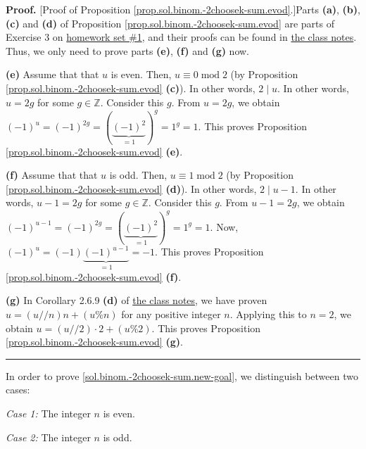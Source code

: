 \documentclass[paper=a4, fontsize=12pt]{scrartcl}%
\theoremstyle{plainsl}
\theoremstyle{definition}
\theoremstyle{remark}
\newenvironment{proof}[1][Proof]{\noindent\textbf{#1.} }{\ \rule{0.5em}{0.5em}}
\begin{document}
\begin{proof}
[Proof of Proposition \ref{prop.sol.binom.-2choosek-sum.evod}.]Parts
\textbf{(a)}, \textbf{(b)}, \textbf{(c)} and \textbf{(d)} of Proposition
\ref{prop.sol.binom.-2choosek-sum.evod} are parts of Exercise 3 on
\href{http://www-users.math.umn.edu/~dgrinber/19s/hw1s.pdf}{homework set \#1},
and their proofs can be found in
\href{http://www-users.math.umn.edu/~dgrinber/19s/notes.pdf}{the class notes}.
Thus, we only need to prove parts \textbf{(e)}, \textbf{(f)} and \textbf{(g)} now.

\textbf{(e)} Assume that that $u$ is even. Then, $u\equiv0\operatorname{mod}2$
(by Proposition \ref{prop.sol.binom.-2choosek-sum.evod} \textbf{(c)}). In
other words, $2\mid u$. In other words, $u=2g$ for some $g\in\mathbb{Z}$.
Consider this $g$. From $u=2g$, we obtain $\left(  -1\right)  ^{u}=\left(
-1\right)  ^{2g}=\left(  \underbrace{\left(  -1\right)  ^{2}}_{=1}\right)
^{g}=1^{g}=1$. This proves Proposition \ref{prop.sol.binom.-2choosek-sum.evod}
\textbf{(e)}.

\textbf{(f)} Assume that that $u$ is odd. Then, $u\equiv1\operatorname{mod}2$
(by Proposition \ref{prop.sol.binom.-2choosek-sum.evod} \textbf{(d)}). In
other words, $2\mid u-1$. In other words, $u-1=2g$ for some $g\in\mathbb{Z}$.
Consider this $g$. From $u-1=2g$, we obtain $\left(  -1\right)  ^{u-1}=\left(
-1\right)  ^{2g}=\left(  \underbrace{\left(  -1\right)  ^{2}}_{=1}\right)
^{g}=1^{g}=1$. Now, $\left(  -1\right)  ^{u}=\left(  -1\right)
\underbrace{\left(  -1\right)  ^{u-1}}_{=1}=-1$. This proves Proposition
\ref{prop.sol.binom.-2choosek-sum.evod} \textbf{(f)}.

\textbf{(g)} In Corollary 2.6.9 \textbf{(d)} of
\href{http://www-users.math.umn.edu/~dgrinber/19s/notes.pdf}{the class notes},
we have proven $u=\left(  u//n\right)
n+\left(  u\%n\right)  $ for any positive integer $n$. Applying this to $n=2$,
we obtain $u=\left(  u//2\right)  \cdot2+\left(  u\%2\right)  $. This proves
Proposition \ref{prop.sol.binom.-2choosek-sum.evod} \textbf{(g)}.
\end{proof}

In order to prove \eqref{sol.binom.-2choosek-sum.new-goal}, we distinguish
between two cases:

\textit{Case 1:} The integer $n$ is even.

\textit{Case 2:} The integer $n$ is odd.
\end{document}
